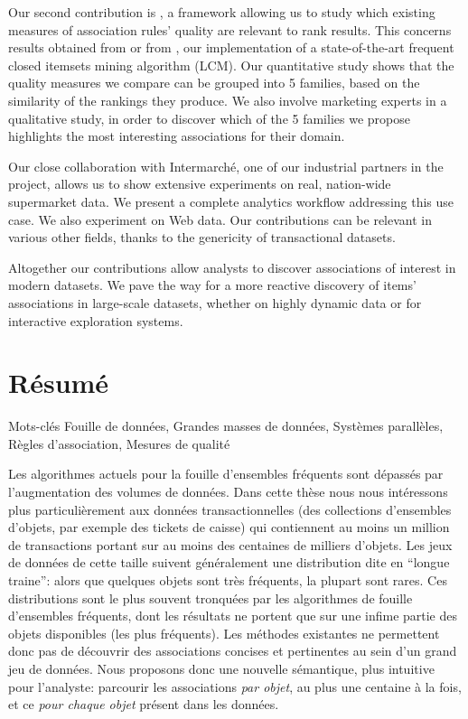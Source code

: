 Our second contribution is \capa, a framework allowing us to study which existing measures of association rules' quality
are relevant to rank results.
This concerns results obtained from \toppi or from \jlcm,
our implementation of a state-of-the-art frequent closed itemsets mining algorithm (LCM).
Our quantitative study shows that the \nbm quality measures we compare can be grouped
into 5 families, based on the similarity of the rankings they produce.
We also involve marketing experts in a qualitative study,
in order to discover which of the 5 families we propose highlights
the most interesting associations for their domain.

Our close collaboration with Intermarch\'e,
one of our industrial partners in the \datalyse project,
allows us to show extensive experiments on real, nation-wide supermarket data.
We present a complete analytics workflow addressing this use case.
We also experiment on Web data.
Our contributions can be relevant in various other fields,
thanks to the genericity of transactional datasets.

Altogether our contributions allow analysts to discover associations of interest in modern datasets.
We pave the way for a more reactive discovery of items' associations in large-scale datasets,
whether on highly dynamic data or for interactive exploration systems.







\vfill\pagebreak
\section*{R\'esum\'e}

\begin{paragraph}{Mots-cl\'es}
Fouille de donn\'ees,
Grandes masses de donn\'ees,
Syst\`emes parall\`eles,
R\`egles d'association,
Mesures de qualit\'e
\end{paragraph}

Les algorithmes actuels pour la fouille d'ensembles fr\'equents sont d\'epass\'es par
l'aug\-mentation des volumes de donn\'ees.
Dans cette th\`ese nous nous int\'eressons plus particuli\`erement aux donn\'ees transactionnelles
(des collections d'ensembles d'objets, par exemple des tickets de caisse)
qui contiennent au moins un million de transactions portant sur au moins des centaines de milliers d'objets.
Les jeux de donn\'ees de cette taille suivent g\'en\'eralement une distribution dite en ``longue traine'':
alors que quelques objets sont tr\`es fr\'equents, la plupart sont rares.
Ces distributions sont le plus souvent tronqu\'ees par les algorithmes de fouille d'ensembles fr\'equents,
dont les r\'esultats ne portent que sur une infime partie des objets disponibles (les plus fr\'equents).
Les m\'ethodes existantes ne permettent donc pas de d\'ecouvrir des associations concises et pertinentes
au sein d'un grand jeu de donn\'ees.
Nous proposons donc une nouvelle s\'emantique, plus intuitive pour l'analyste:
parcourir les associations {\em par objet}, au plus une centaine \`a la fois, et ce {\em pour chaque objet} pr\'esent
dans les donn\'ees.

